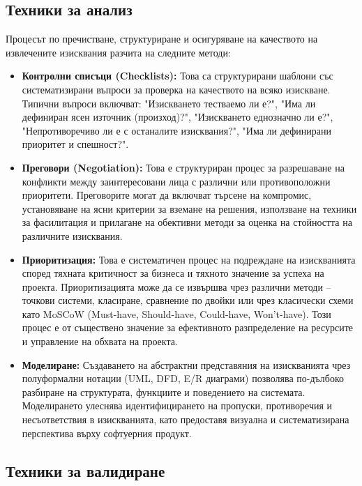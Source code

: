 \documentclass{scrartcl}
\begin{document}
\begin{FlushLeft}
\subsection{Техники за анализ}

Процесът по пречистване, структуриране и осигуряване на качеството на извлечените изисквания разчита на следните методи:

\begin{itemize}
    \item \textbf{Контролни списъци (Checklists):} Това са структурирани шаблони със систематизирани въпроси за проверка на качеството на всяко изискване. Типични въпроси включват: "Изискването тестваемо ли е?", "Има ли дефиниран ясен източник (произход)?", "Изискването еднозначно ли е?", "Непротиворечиво ли е с останалите изисквания?", "Има ли дефинирани приоритет и спешност?".
    
    \item \textbf{Преговори (Negotiation):} Това е структуриран процес за разрешаване на конфликти между заинтересовани лица с различни или противоположни приоритети. Преговорите могат да включват търсене на компромис, установяване на ясни критерии за вземане на решения, използване на техники за фасилитация и прилагане на обективни методи за оценка на стойността на различните изисквания.
    
    \item \textbf{Приоритизация:} Това е систематичен процес на подреждане на изискванията според тяхната критичност за бизнеса и тяхното значение за успеха на проекта. Приоритизацията може да се извършва чрез различни методи -- точкови системи, класиране, сравнение по двойки или чрез класически схеми като MoSCoW (Must-have, Should-have, Could-have, Won't-have). Този процес е от съществено значение за ефективното разпределение на ресурсите и управление на обхвата на проекта.
    
    \item \textbf{Моделиране:} Създаването на абстрактни представяния на изискванията чрез полуформални нотации (UML, DFD, E/R диаграми) позволява по-дълбоко разбиране на структурата, функциите и поведението на системата. Моделирането улеснява идентифицирането на пропуски, противоречия и несъответствия в изискванията, като предоставя визуална и систематизирана перспектива върху софтуерния продукт.
\end{itemize}

\subsection{Техники за валидиране}


\end{FlushLeft}
\end{document}

